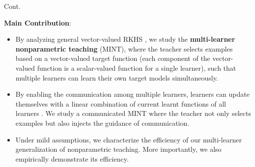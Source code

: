 \documentclass[aspectratio=169,xcolor=dvipsnames]{beamer}
\begin{document}
\begin{frame}{Cont.}

{\bf \color{blue} Main Contribution}: 
\begin{itemize}
\justifying
\item By analyzing general \alert{vector-valued RKHS} \cite{carmeli2006vector, minh2011vector, alvarez2012kernels}, we study the {\bf multi-learner nonparametric teaching} (MINT), where the teacher selects examples based on a \alert{vector-valued target function} (each component of the vector-valued function is a scalar-valued function for a single learner), such that \alert{multiple} learners can learn their own target models simultaneously. 
\item By enabling the \alert{communication} among multiple learners, learners can update themselves with a \alert{linear combination} of current learnt functions of all learners \cite{gehler2009feature,cesamultitask}. We study a communicated MINT where the teacher not only selects examples but also injects the \alert{guidance} of communication. 
\item Under mild assumptions, we characterize the \alert{efficiency} of our \alert{multi-learner generalization} of nonparametric teaching. More importantly, we also \alert{empirically} demonstrate its efficiency.
\end{itemize}
\end{frame}
\end{document}
